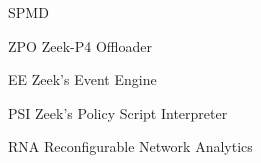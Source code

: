 
\begin{listofabbrv}{SPMD}
    \item[ZPO] Zeek-P4 Offloader
    \item[EE]  Zeek's Event Engine
    \item[PSI] Zeek's Policy Script Interpreter
    \item[RNA] Reconfigurable Network Analytics
\end{listofabbrv}